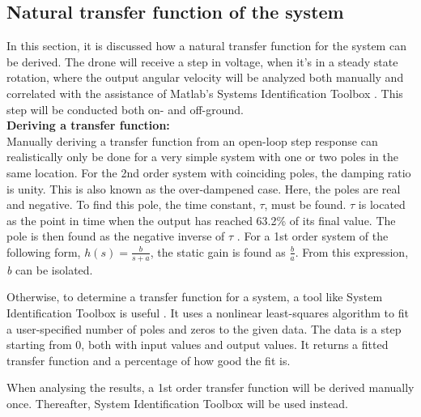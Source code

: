 \subsection{Natural transfer function of the system}
In this section, it is discussed how a natural transfer function for the system can be derived. The drone will receive a step in voltage, when it's in a steady state rotation, where the output angular velocity will be analyzed both manually and correlated with the assistance of Matlab's Systems Identification Toolbox \cite{SysidToolbox}. This step will be conducted both on- and off-ground.\\

\textbf{Deriving a transfer function:}\\ \label{tf_teori}Manually deriving a transfer function from an open-loop step response can realistically only be done for a very simple system with one or two poles in the same location. For the 2nd order system with coinciding poles, the damping ratio is unity. This is also known as the over-dampened case. Here, the poles are real and negative.
To find this pole, the time constant, $\tau$, must be found. $\tau$ is located as the point in time when the output has reached 63.2\% of its final value. The pole is then found as the negative inverse of $\tau$ \cite{reguleringsbog}. For a 1st order system of the following form, $h(s) = \frac{b}{s+a}$, the static gain is found as $\frac{b}{a}$. From this expression, \textit{b} can be isolated. 

Otherwise, to determine a transfer function for a system, a tool like System Identification Toolbox is useful \cite{SysidToolbox}. It uses a nonlinear least-squares algorithm to fit a user-specified number of poles and zeros to the given data. The data is a step starting from 0, both with input values and output values. It returns a fitted transfer function and a percentage of how good the fit is. 

When analysing the results, a 1st order transfer function will be derived manually once. Thereafter, System Identification Toolbox will be used instead. 

